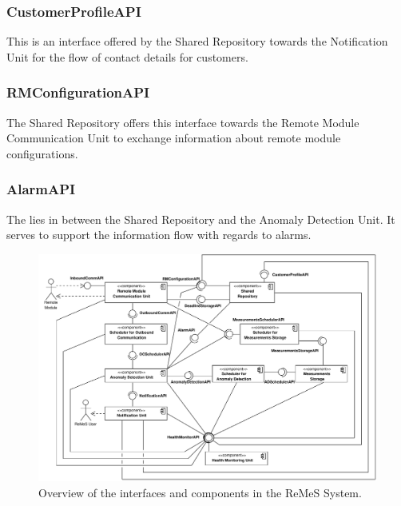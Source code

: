 \subsubsection{CustomerProfileAPI}

\npar This is an interface offered by the Shared Repository towards the
Notification Unit for the flow of contact details for customers.

\subsubsection{RMConfigurationAPI}

\npar The Shared Repository offers this interface towards the Remote Module
Communication Unit to exchange information about remote module configurations.

\subsubsection{AlarmAPI}

\npar The  lies in between the Shared Repository and the
Anomaly Detection Unit. It serves to support the information flow with regards
to alarms.

\begin{figure}[H]
	\begin{centering}
		\includegraphics[height=\textwidth,angle=90]{figs/add-it1-interfaces.pdf}
		\caption{Overview of the interfaces and components in the ReMeS
		System.}
		\label{fig:it1/interfaces}
	\end{centering}
\end{figure}

